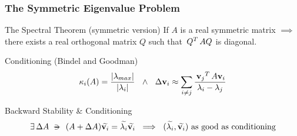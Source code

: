 \begin{frame}
  \frametitle{The Symmetric Eigenvalue Problem}
  \begin{block}{The Spectral Theorem (symmetric version)}
    If $A$ is a real symmetric matrix $\implies$ there exists a real orthogonal matrix $Q$ such that $\,{Q}^{T}\,AQ$ is diagonal. 
  \end{block}
  \begin{block}{Conditioning (Bindel and Goodman)}
    \[
    \kappa_{i}(A) = \dfrac{\left\lvert \lambda_{max} \right\vert}{\left\lvert \lambda_i \right\vert}
    \,\,\,\,\land\,\,\,\,
    \Delta \mathbf{v}_i \approx \sum\limits_{\tiny{i \ne j}}
    \dfrac{\,{\mathbf{v}_j}^{T}\, A \mathbf{v}_i}{\lambda_i - \lambda_j} 
    \]
  \end{block}
  \begin{block}{Backward Stability \& Conditioning}
    \[
    \joinabove{0}    
    \exists\,\Delta A \suchthat
    (A + \Delta A)\apx{\vec{v}_i} = \apx{\lambda_i}\apx{\vec{v}_i}
    \ds{\implies}
    (\apx{\lambda_i},\apx{\vec{v}_i}) \text{ as good as conditioning}
    \]
    \end{block}
\end{frame}
